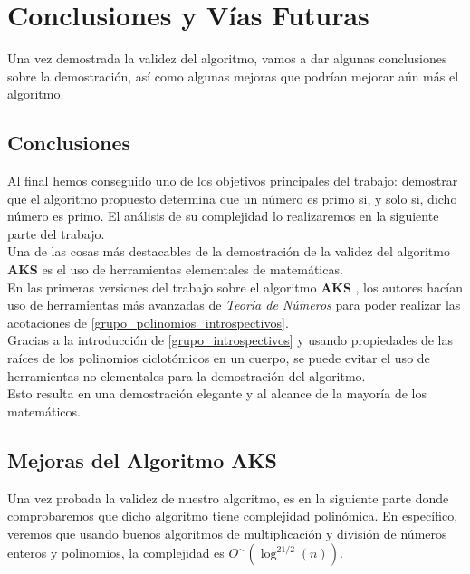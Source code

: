 \chapter{Conclusiones y Vías Futuras}

Una vez demostrada la validez del algoritmo, vamos a dar algunas conclusiones sobre la demostración, así como algunas mejoras que podrían mejorar aún más el algoritmo.

\section{Conclusiones}

Al final hemos conseguido uno de los objetivos principales del trabajo: demostrar que el algoritmo propuesto determina que un número es primo si, y solo si, dicho número es primo. El análisis de su complejidad lo realizaremos en la siguiente parte del trabajo.\\

Una de las cosas más destacables de la demostración de la validez del algoritmo \textbf{AKS} es el uso de herramientas elementales de matemáticas.\\

En las primeras versiones del trabajo sobre el algoritmo \textbf{AKS} \cite{AKS2004}, los autores hacían uso de herramientas más avanzadas de \textit{Teoría de Números} para poder realizar las acotaciones de \eqref{grupo_polinomios_introspectivos}.\\

Gracias a la introducción de \eqref{grupo_introspectivos} y usando propiedades de las raíces de los polinomios ciclotómicos en un cuerpo, se puede evitar el uso de herramientas no elementales para la demostración del algoritmo.\\

Esto resulta en una demostración elegante y al alcance de la mayoría de los matemáticos.

\section{Mejoras del Algoritmo AKS}

Una vez probada la validez de nuestro algoritmo, es en la siguiente parte donde comprobaremos que dicho algoritmo tiene complejidad polinómica. En específico, veremos que usando buenos algoritmos de multiplicación y división de números enteros y polinomios, la complejidad es $O^\sim(\log^{21/2}(n))$.\\

